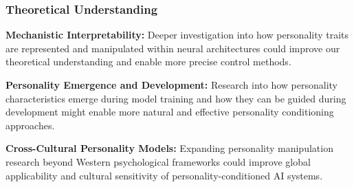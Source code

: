 \subsubsection{Theoretical Understanding}

\textbf{Mechanistic Interpretability:} Deeper investigation into how personality traits are represented and manipulated within neural architectures could improve our theoretical understanding and enable more precise control methods.

\textbf{Personality Emergence and Development:} Research into how personality characteristics emerge during model training and how they can be guided during development might enable more natural and effective personality conditioning approaches.

\textbf{Cross-Cultural Personality Models:} Expanding personality manipulation research beyond Western psychological frameworks could improve global applicability and cultural sensitivity of personality-conditioned AI systems.

